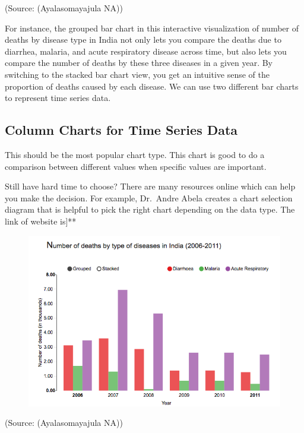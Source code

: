 \documentclass[]{book}
\begin{document}
(Source: (Ayalasomayajula NA))

For instance, the grouped bar chart in this interactive visualization of
number of deaths by disease type in India not only lets you compare the
deaths due to diarrhea, malaria, and acute respiratory disease across
time, but also lets you compare the number of deaths by these three
diseases in a given year. By switching to the stacked bar chart view,
you get an intuitive sense of the proportion of deaths caused by each
disease. We can use two different bar charts to represent time series
data.

\subsection{Column Charts for Time Series
Data}\label{column-charts-for-time-series-data}

This should be the most popular chart type. This chart is good to do a
comparison between different values when specific values are important.

Still have hard time to choose? There are many resources online which
can help you make the decision. For example, Dr.~Andre Abela creates a
chart selection diagram that is helpful to pick the right chart
depending on the data type. The link of website is{]}**

\begin{figure}
\centering
\includegraphics{images/aya-bar1.png}
\caption{}
\end{figure}

(Source: (Ayalasomayajula NA))
\end{document}
